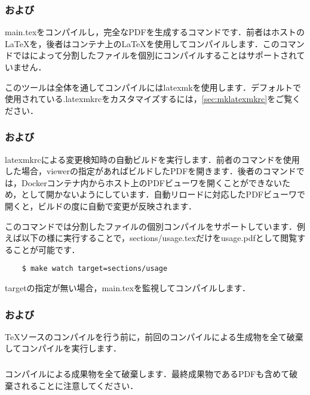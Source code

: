\documentclass[../main]{subfiles}
\begin{document}
\subsubsection{および}

main.texをコンパイルし，完全なPDFを生成するコマンドです．前者はホストのLaTeXを，後者はコンテナ上のLaTeXを使用してコンパイルします．このコマンドではによって分割したファイルを個別にコンパイルすることはサポートされていません．


このツールは全体を通してコンパイルにはlatexmkを使用します．デフォルトで使用されている.latexmkrcをカスタマイズするには，\ref{sec:mklatexmkrc}をご覧ください．

\subsubsection{および}

latexmkrcによる変更検知時の自動ビルドを実行します．前者のコマンドを使用した場合，viewerの指定があればビルドしたPDFを開きます．後者のコマンドでは，Dockerコンテナ内からホスト上のPDFビューワを開くことができないため，として開かないようにしています．自動リロードに対応したPDFビューワで開くと，ビルドの度に自動で変更が反映されます．


このコマンドでは分割したファイルの個別コンパイルをサポートしています．例えば以下の様に実行することで，sections/usage.texだけをusage.pdfとして閲覧することが可能です．

\begin{verbatim}
    $ make watch target=sections/usage
\end{verbatim}

targetの指定が無い場合，main.texを監視してコンパイルします．

\subsubsection{および}

TeXソースのコンパイルを行う前に，前回のコンパイルによる生成物を全て破棄してコンパイルを実行します．

\subsubsection{}

コンパイルによる成果物を全て破棄します．最終成果物であるPDFも含めて破棄されることに注意してください．
\end{document}
